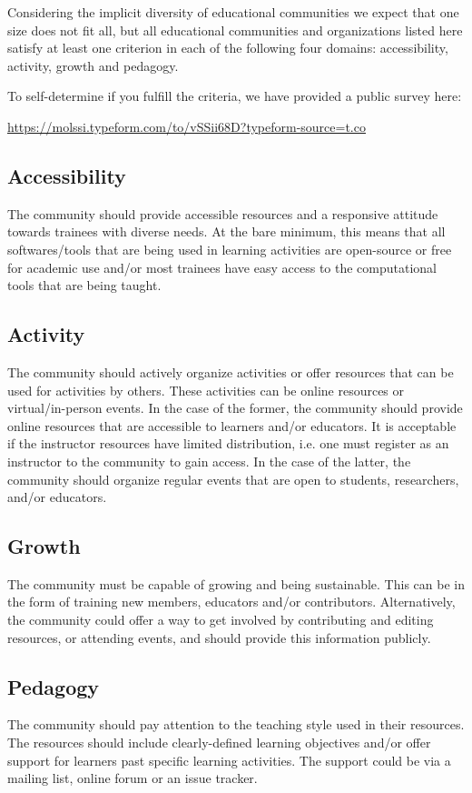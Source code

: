 \documentclass[9pt,review]{livecoms}
\begin{document}
Considering the implicit diversity of educational communities we expect that one size does not fit all, but all educational communities and organizations listed here satisfy at least one criterion in each of the following four domains: accessibility, activity, growth and pedagogy. %

To self-determine if you fulfill the criteria, we have provided a public survey here:

\url{https://molssi.typeform.com/to/vSSii68D?typeform-source=t.co}

\subsection{Accessibility}
The community should provide accessible resources and a responsive attitude towards trainees with diverse needs. At the bare minimum, this means that all softwares/tools that are being used in learning activities are open-source or free for academic use and/or most trainees have easy access to the computational tools that are being taught. 
\subsection{Activity}
The community should actively organize activities or offer resources that can be used for activities by others. These activities can be online resources or virtual/in-person events. In the case of the former, the community should provide online resources that are accessible to learners and/or educators. It is acceptable if the instructor resources have limited distribution, i.e. one must register as an instructor to the community to gain access. In the case of the latter, the community should organize regular events that are open to students, researchers, and/or educators.
\subsection{Growth} 
The community must be capable of growing and being sustainable. This can be in the form of training new members, educators and/or contributors. Alternatively, the community could offer a way to get involved by contributing and editing resources, or attending events, and should provide this information publicly.
\subsection{Pedagogy}
The community should pay attention to the teaching style used in their resources. The resources should include clearly-defined learning objectives and/or offer support for learners past specific learning activities. The support could be via a mailing list, online forum or an issue tracker.
\end{document}
